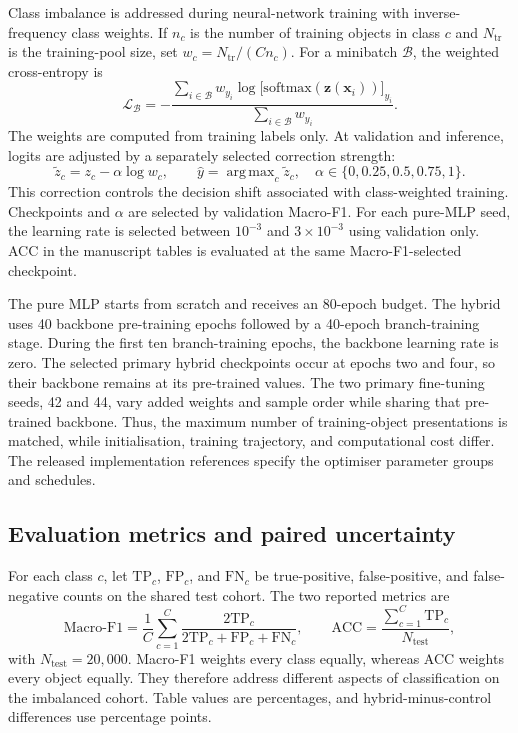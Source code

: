 \documentclass[aps,a4paper,onecolumn,11pt,unpublished]{quantumarticle}
\begin{document}
Class imbalance is addressed during neural-network training with inverse-frequency class weights. If $n_c$ is the number of training objects in class $c$ and $N_{\mathrm{tr}}$ is the training-pool size, set $w_c=N_{\mathrm{tr}}/(C n_c)$. For a minibatch $\mathcal B$, the weighted cross-entropy is
\begin{equation}
\mathcal L_{\mathcal B}=-
\frac{\displaystyle\sum_{i\in\mathcal B}w_{y_i}
\log\bigl[\mathrm{softmax}(\mathbf z(\mathbf x_i))\bigr]_{y_i}}
{\displaystyle\sum_{i\in\mathcal B}w_{y_i}}.
\label{eq:loss}
\end{equation}
The weights are computed from training labels only. At validation and inference, logits are adjusted by a separately selected correction strength:
\begin{equation}
\tilde z_c=z_c-\alpha\log w_c,\qquad
\hat y=\mathop{\mathrm{arg\,max}}_{c}\tilde z_c,
\quad\alpha\in\{0,0.25,0.5,0.75,1\}.
\label{eq:correction}
\end{equation}
This correction controls the decision shift associated with class-weighted training. Checkpoints and $\alpha$ are selected by validation Macro-F1. For each pure-MLP seed, the learning rate is selected between $10^{-3}$ and $3\times10^{-3}$ using validation only. ACC in the manuscript tables is evaluated at the same Macro-F1-selected checkpoint.

The pure MLP starts from scratch and receives an 80-epoch budget. The hybrid uses 40 backbone pre-training epochs followed by a 40-epoch branch-training stage. During the first ten branch-training epochs, the backbone learning rate is zero. The selected primary hybrid checkpoints occur at epochs two and four, so their backbone remains at its pre-trained values. The two primary fine-tuning seeds, 42 and 44, vary added weights and sample order while sharing that pre-trained backbone. Thus, the maximum number of training-object presentations is matched, while initialisation, training trajectory, and computational cost differ. The released implementation references specify the optimiser parameter groups and schedules.

\subsection{Evaluation metrics and paired uncertainty}

For each class $c$, let $\mathrm{TP}_c$, $\mathrm{FP}_c$, and $\mathrm{FN}_c$ be true-positive, false-positive, and false-negative counts on the shared test cohort. The two reported metrics are
\begin{equation}
\mathrm{Macro\!\text{-}\!F1}=\frac1C\sum_{c=1}^{C}
\frac{2\mathrm{TP}_c}{2\mathrm{TP}_c+\mathrm{FP}_c+\mathrm{FN}_c},
\qquad
\mathrm{ACC}=\frac{\sum_{c=1}^{C}\mathrm{TP}_c}{N_{\mathrm{test}}},
\label{eq:metrics}
\end{equation}
with $N_{\mathrm{test}}=20{,}000$. Macro-F1 weights every class equally, whereas ACC weights every object equally. They therefore address different aspects of classification on the imbalanced cohort. Table values are percentages, and hybrid-minus-control differences use percentage points.
\end{document}
